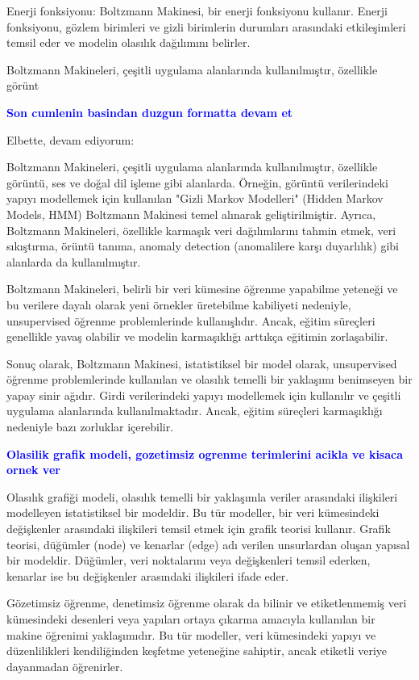 \documentclass[11pt]{article}
\begin{document}
Enerji fonksiyonu: Boltzmann Makinesi, bir enerji fonksiyonu kullanır. Enerji fonksiyonu, gözlem birimleri ve gizli birimlerin durumları arasındaki etkileşimleri temsil eder ve modelin olasılık dağılımını belirler.

Boltzmann Makineleri, çeşitli uygulama alanlarında kullanılmıştır, özellikle görünt

\textbf{\textcolor{blue}{Son cumlenin basindan duzgun formatta devam et}}

Elbette, devam ediyorum:

Boltzmann Makineleri, çeşitli uygulama alanlarında kullanılmıştır, özellikle görüntü, ses ve doğal dil işleme gibi alanlarda. Örneğin, görüntü verilerindeki yapıyı modellemek için kullanılan "Gizli Markov Modelleri" (Hidden Markov Models, HMM) Boltzmann Makinesi temel alınarak geliştirilmiştir. Ayrıca, Boltzmann Makineleri, özellikle karmaşık veri dağılımlarını tahmin etmek, veri sıkıştırma, örüntü tanıma, anomaly detection (anomalilere karşı duyarlılık) gibi alanlarda da kullanılmıştır.

Boltzmann Makineleri, belirli bir veri kümesine öğrenme yapabilme yeteneği ve bu verilere dayalı olarak yeni örnekler üretebilme kabiliyeti nedeniyle, unsupervised öğrenme problemlerinde kullanışlıdır. Ancak, eğitim süreçleri genellikle yavaş olabilir ve modelin karmaşıklığı arttıkça eğitimin zorlaşabilir.

Sonuç olarak, Boltzmann Makinesi, istatistiksel bir model olarak, unsupervised öğrenme problemlerinde kullanılan ve olasılık temelli bir yaklaşımı benimseyen bir yapay sinir ağıdır. Girdi verilerindeki yapıyı modellemek için kullanılır ve çeşitli uygulama alanlarında kullanılmaktadır. Ancak, eğitim süreçleri karmaşıklığı nedeniyle bazı zorluklar içerebilir.

\textbf{\textcolor{blue}{Olasilik grafik modeli, gozetimsiz ogrenme terimlerini acikla ve kisaca ornek ver}}

Olasılık grafiği modeli, olasılık temelli bir yaklaşımla veriler arasındaki ilişkileri modelleyen istatistiksel bir modeldir. Bu tür modeller, bir veri kümesindeki değişkenler arasındaki ilişkileri temsil etmek için grafik teorisi kullanır. Grafik teorisi, düğümler (node) ve kenarlar (edge) adı verilen unsurlardan oluşan yapısal bir modeldir. Düğümler, veri noktalarını veya değişkenleri temsil ederken, kenarlar ise bu değişkenler arasındaki ilişkileri ifade eder.

Gözetimsiz öğrenme, denetimsiz öğrenme olarak da bilinir ve etiketlenmemiş veri kümesindeki desenleri veya yapıları ortaya çıkarma amacıyla kullanılan bir makine öğrenimi yaklaşımıdır. Bu tür modeller, veri kümesindeki yapıyı ve düzenlilikleri kendiliğinden keşfetme yeteneğine sahiptir, ancak etiketli veriye dayanmadan öğrenirler.
\end{document}
